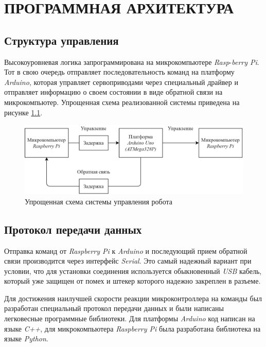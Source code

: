 \chapter{\MakeUppercase{Программная архитектура}} \label{chap:arch}
\section{Структура управления}

Высокоуровневая логика запрограммирована на микрокомпьютере \textit{Rasp}-\textit{berry Pi}. Тот в свою очередь отправляет последовательность команд на платформу \textit{Arduino}, которая управляет сервоприводами через специальный драйвер и отправляет информацию о своем состоянии в виде обратной связи на микрокомпьютер. Упрощенная схема реализованной системы приведена на рисунке \ref{fig:upravlenie}.

\begin{figure}[h!]
    \centering
    \includegraphics[width=\textwidth]{chapter_arch/figure2.png}
    \caption{Упрощенная схема системы управления робота}
    \label{fig:upravlenie}
\end{figure}

\section{Протокол передачи данных} \label{sec:protocol}
Отправка команд от \textit{Raspberry Pi} к \textit{Arduino} и последующий прием обратной связи производится через интерфейс \textit{Serial}. Это самый надежный вариант при условии, что для установки соединения используется обыкновенный \textit{USB} кабель, который уже защищен от помех и штекер которого надежно закреплен в разъеме.

Для достижения наилучшей скорости реакции микроконтроллера на команды был разработан специальный протокол передачи данных и были написаны легковесные программные библиотеки. Для платформы \textit{Arduino} код написан на языке \textit{C++}, для микрокомпьютера \textit{Raspberry Pi} была разработана библиотека на языке \textit{Python}.

